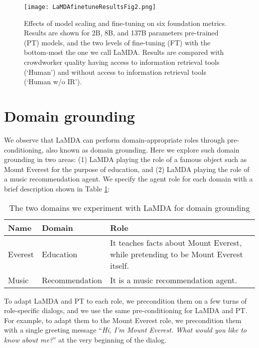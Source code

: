 \documentclass{article}
\begin{document}
\begin{figure}[h!]
    \centering
\texttt{[image: LaMDAfinetuneResultsFig2.png]}
    \caption{Effects of model scaling and fine-tuning on six foundation metrics. Results are shown for 2B, 8B, and 137B parameters pre-trained (PT) models, and the two levels of fine-tuning (FT) with the bottom-most the one we call LaMDA. Results are compared with crowdworker quality having access to information retrieval tools (`Human') and without access to information retrieval tools (`Human w/o IR').}
    \label{fig:results-over-ftn)}
\end{figure}


\section{Domain grounding}
\label{sec:domain-grounding}

We observe that LaMDA can perform domain-appropriate roles through pre-conditioning, also known as domain grounding. Here we explore such domain grounding in two areas: (1) LaMDA playing the role of  a famous object such as Mount Everest for the purpose of education, and (2) LaMDA playing the role of a music recommendation agent. We specify the agent role for each domain with a brief description shown in Table \ref{tab:roles}:

\begin{table}[h!]
    \caption{The two domains we experiment with LaMDA for domain grounding}
    \centering
        \begin{tabular}{lll}
        \toprule
         Name & Domain & Role \\
        \midrule
          Everest &  Education & It teaches facts about Mount Everest, while pretending to be Mount Everest itself. \\
          Music &  Recommendation &  It is a music recommendation agent. \\
        \bottomrule
        \end{tabular}
    \label{tab:roles}
\end{table}

To adapt LaMDA and PT to each role, we precondition them on a few turns of role-specific dialogs, and we use the same pre-conditioning for LaMDA and PT. For example, to adapt them to the Mount Everest role, we precondition them with a single greeting message ``\textit{Hi, I’m Mount Everest. What would you like to know about me?}'' at the very beginning of the dialog. 
\end{document}
